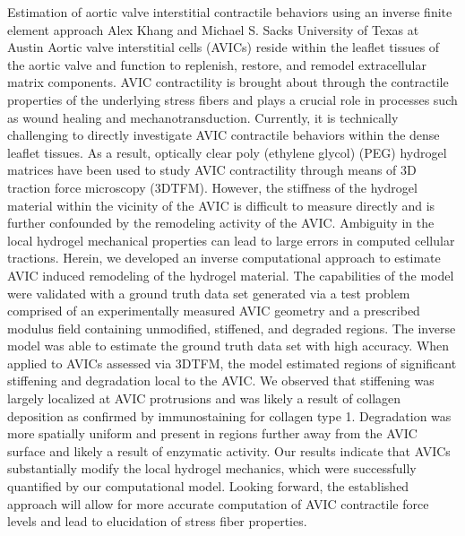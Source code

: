 \vspace{1.5ex}
\abs
{Estimation of aortic valve interstitial contractile behaviors using an inverse finite element approach}
{Alex Khang and Michael S. Sacks}
{University of Texas at Austin}
{Aortic valve interstitial cells (AVICs) reside within the leaflet tissues of the aortic valve and function to replenish, restore, and remodel extracellular matrix components. AVIC contractility is brought about through the contractile properties of the underlying stress fibers and plays a crucial role in processes such as wound healing and mechanotransduction. Currently, it is technically challenging to directly investigate AVIC contractile behaviors within the dense leaflet tissues. As a result, optically clear poly (ethylene glycol) (PEG) hydrogel matrices have been used to study AVIC contractility through means of 3D traction force microscopy (3DTFM). However, the stiffness of the hydrogel material within the vicinity of the AVIC is difficult to measure directly and is further confounded by the remodeling activity of the AVIC. Ambiguity in the local hydrogel mechanical properties can lead to large errors in computed cellular tractions. Herein, we developed an inverse computational approach to estimate AVIC induced remodeling of the hydrogel material. The capabilities of the model were validated with a ground truth data set generated via a test problem comprised of an experimentally measured AVIC geometry and a prescribed modulus field containing unmodified, stiffened, and degraded regions. The inverse model was able to estimate the ground truth data set with high accuracy. When applied to AVICs assessed via 3DTFM, the model estimated regions of significant stiffening and degradation local to the AVIC. We observed that stiffening was largely localized at AVIC protrusions and was likely a result of collagen deposition as confirmed by immunostaining for collagen type 1. Degradation was more spatially uniform and present in regions further away from the AVIC surface and likely a result of enzymatic activity. Our results indicate that AVICs substantially modify the local hydrogel mechanics, which were successfully quantified by our computational model. Looking forward, the established approach will allow for more accurate computation of AVIC contractile force levels and lead to elucidation of stress fiber properties.}



